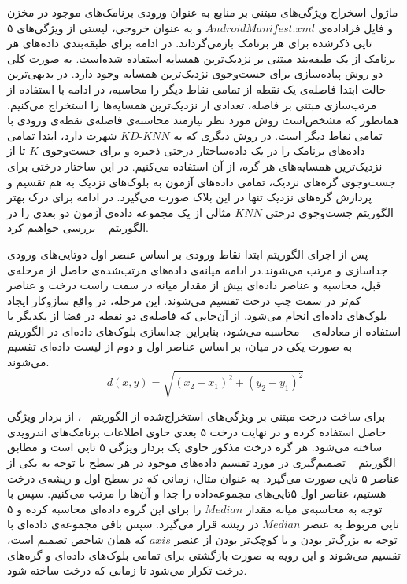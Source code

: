 ماژول اسخراج ویژگی‌های مبتنی بر منابع به عنوان ورودی برنامک‌های موجود در مخزن و فایل فراداده‌ی $AndroidManifest.xml$ و به عنوان خروجی، لیستی از ویژگی‌های ۵ تایی ذکرشده برای هر برنامک بازمی‌گرداند.
در ادامه برای طبقه‌بندی داده‌های هر برنامک از یک طبقه‌بند مبتنی بر نزدیک‌ترین همسایه‌ استفاده ‌شده‌است. به صورت کلی دو روش پیاده‌سازی برای جست‌و‌جوی نزدیک‌ترین همسایه وجود دارد. در بدیهی‌ترین حالت ابتدا فاصله‌ی یک نقطه از تمامی نقاط‌ دیگر را محاسبه، در ادامه با استفاده از مرتب‌سازی مبتنی بر فاصله، تعدادی از نزدیک‌ترین همسایه‌ها را استخراج می‌کنیم. همانطور که مشخص‌است روش مورد نظر نیازمند محاسبه‌ی فاصله‌ی نقطه‌ی ورودی با تمامی نقاط دیگر ‌است. در روش دیگری که به $KD\text{-}KNN$ شهرت دارد، ابتدا تمامی داده‌های برنامک را در یک داده‌ساختار درختی ذخیره و برای جست‌و‌جوی $K$ تا از نزدیک‌ترین همسایه‌های هر گره، از آن استفاده می‌کنیم. در این ساختار درختی برای جست‌و‌جوی گره‌های نزدیک، تمامی داده‌های آزمون به بلوک‌های نزدیک به هم تقسیم و پردازش گره‌های نزدیک‌ تنها در این بلاک صورت می‌گیرد. در ادامه برای درک بهتر الگوریتم جست‌و‌جوی درختی $KNN$ مثالی از یک مجموعه‌ داده‌ی آزمون دو بعدی را در الگوریتم ~ بررسی خواهیم کرد. 

پس از اجرای الگوریتم ابتدا نقاط ورودی بر اساس عنصر اول دوتایی‌های ورودی جداسازی و مرتب‌ می‌شوند.در ادامه میانه‌ی داده‌‌های مرتب‌شده‌ی حاصل از مرحله‌ی قبل، محاسبه و عناصر داده‌ای بیش از مقدار میانه در سمت راست درخت و عناصر کم‌تر در سمت چپ درخت تقسیم می‌شوند. این مرحله‌، در واقع سازو‌کار ایجاد بلوک‌های داده‌ای انجام می‌شود. از آن‌جایی که فاصله‌ی دو نقطه در فضا از یکدیگر با استفاده از معادله‌ی ~ محاسبه می‌شود، بنابراین جداسازی بلوک‌های داده‌ای در الگوریتم ~ به صورت یکی در میان، بر اساس عناصر اول و دوم از لیست داده‌ای تقسیم می‌شوند.
\begin{equation}
	d(x,y)=\sqrt{(x_{2}-x_{1})^2 + (y_{2}-y_{1})^2} \label{eq:1}
\end{equation}

برای ساخت درخت مبتنی بر ویژگی‌های استخراج‌شده از الگوریتم ~، از بردار ویژگی حاصل استفاده کرده و در نهایت درخت ۵ بعدی حاوی اطلاعات برنامک‌های اندرویدی ساخته می‌شود. هر گره درخت مذکور حاوی یک بردار ویژگی ۵ تایی است و مطابق الگوریتم ~ تصمیم‌گیری در مورد تقسیم داده‌های موجود در هر سطح با توجه به یکی از عناصر ۵ تایی صورت می‌گیرد. به عنوان مثال، زمانی که در سطح اول و ریشه‌ی درخت هستیم، عناصر اول ۵‌تایی‌های مجموعه‌داده را جدا و آن‌ها را مرتب می‌کنیم. سپس با توجه به محاسبه‌ی میانه مقدار $Median$ را برای این گروه داده‌ای محاسبه کرده و ۵ تایی مربوط به عنصر $Median$ در ریشه قرار می‌گیرد. سپس باقی مجموعه‌ی داده‌ای با توجه به بزرگ‌تر بودن و یا کوچک‌تر بودن از عنصر  $axis$ که همان شاخص تصمیم است، تقسیم می‌شوند و این رویه به صورت بازگشتی برای تمامی بلوک‌های داده‌ای و گره‌های درخت تکرار می‌شود تا زمانی که درخت ساخته شود.

